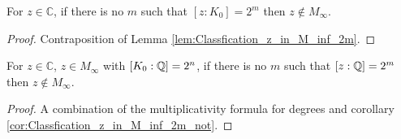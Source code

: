 \begin{corollary}
    \label{cor:Classfication_z_in_M_inf_2m_not}
    \leanok
    For $z \in \mathbb{C}$, if there is no $m$ such that $[z:K_0] = 2^m$ then $z \notin M_{\infty}$.
\end{corollary}

\begin{proof}
    \leanok
    Contraposition of Lemma \ref{lem:Classfication_z_in_M_inf_2m}.
\end{proof}

\begin{corollary}
    \label{cor:Classfication_z_in_M_inf_2m_rat}
    \leanok
    For $z \in \mathbb{C}$, $z \in M_{\infty}$ with $[K_0:\mathbb{Q}] = 2^n$,  if there is no $m$ such that $[z:\mathbb{Q}] = 2^m$ then $z \notin M_{\infty}$.
\end{corollary}

\begin{proof}
    \leanok
    A combination of the multiplicativity formula for degrees and corollary \ref{cor:Classfication_z_in_M_inf_2m_not}.
\end{proof}